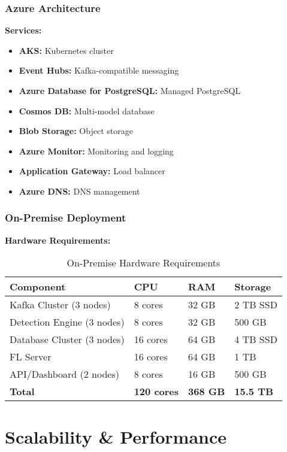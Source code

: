 \documentclass[12pt,a4paper]{article}
\begin{document}
\subsubsection{Azure Architecture}

\textbf{Services:}
\begin{itemize}[leftmargin=1cm,itemsep=0pt]
    \item \textbf{AKS:} Kubernetes cluster
    \item \textbf{Event Hubs:} Kafka-compatible messaging
    \item \textbf{Azure Database for PostgreSQL:} Managed PostgreSQL
    \item \textbf{Cosmos DB:} Multi-model database
    \item \textbf{Blob Storage:} Object storage
    \item \textbf{Azure Monitor:} Monitoring and logging
    \item \textbf{Application Gateway:} Load balancer
    \item \textbf{Azure DNS:} DNS management
\end{itemize}

\subsubsection{On-Premise Deployment}

\textbf{Hardware Requirements:}

\begin{table}[H]
\centering
\small
\begin{tabular}{|l|l|l|l|}
\hline
\textbf{Component} & \textbf{CPU} & \textbf{RAM} & \textbf{Storage} \\
\hline
Kafka Cluster (3 nodes) & 8 cores & 32 GB & 2 TB SSD \\
Detection Engine (3 nodes) & 8 cores & 32 GB & 500 GB \\
Database Cluster (3 nodes) & 16 cores & 64 GB & 4 TB SSD \\
FL Server & 16 cores & 64 GB & 1 TB \\
API/Dashboard (2 nodes) & 8 cores & 16 GB & 500 GB \\
\hline
\textbf{Total} & \textbf{120 cores} & \textbf{368 GB} & \textbf{15.5 TB} \\
\hline
\end{tabular}
\caption{On-Premise Hardware Requirements}
\end{table}

\section{Scalability \& Performance}
\end{document}
